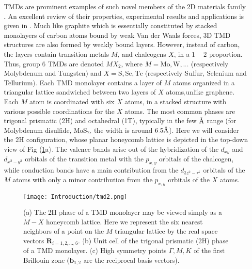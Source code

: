 \acl{TMD}s are prominent examples of such novel members of the \ac{2D} materials family \cite{wang_electronics_2012, roldan_electronic_2014, xu_spin_2014}.
An excellent review of their properties, experimental results and applications is given in \cite{manzeli_2d_2017}.
Much like graphite which is essentially constituted by stacked monolayers of carbon atoms bound by weak Van der Waals forces, 3D \ac{TMD} structures are also formed by weakly bound layers.
However, instead of carbon, the layers contain transition metals $M$, and chalcogens $X$, in a $1-2$ proportion.
Thus, group 6 \acp{TMD} are denoted $MX_2$, where $M = \text{Mo}, \text{W}, ...$ (respectively Molybdenum and Tungsten) and $X = \text{S}, \text{Se}, \text{Te}$ (respectively Sulfur, Selenium and Tellurium).
Each \acs{TMD} monolayer contains a layer of $M$ atoms organized in a triangular lattice sandwiched between two layers of $X$ atoms,unlike graphene.
Each $M$ atom is coordinated with six $X$ atoms, in a stacked structure with various possible coordinations for the $X$ atoms.
The most common phases are trigonal prismatic (2H) and octahedral (1T), typically in the few $\textup{\AA}$ range (for Molybdenum disulfide, $\text{Mo}\text{S}_2$, the width is around $6.5 \textup{\AA}$).
Here we will consider the 2H configuration, whose planar honeycomb lattice is depicted in the top-down view of Fig (\ref{fig:tmdHex}a).
The valence bands arise out of the hybridization of the $d_{xy}$ and $d_{x^2 - y^2}$ orbitals of the transition metal with the $p_{x, y}$ orbitals of the chalcogen, while conduction bands have a main contribution from the $d_{3z^2 - r^2}$ orbitals of the $M$ atoms with only a minor contribution from the $p_{x, y}$ orbitals of the $X$ atoms.
\begin{figure}[H]
\centering
\texttt{[image: Introduction/tmd2.png]}
 \caption[\ac{TMD} monolayer condensing in its 2H phase.
 $M-X$ honeycomb lattice.
 Unit cell of the trigonal prismatic (2H) phase of a \ac{TMD} monolayer.
 High symmetry points of the corresponding hexagonal lattice's  reciprocal space.]{(a) The 2H phase of a  \ac{TMD} monolayer may be viewed simply as a $M-X$ honeycomb lattice. Here we represent the six nearest neighbors of a point on the $M$ triangular lattice by the real space vectors $\bm R_{i = 1,2,..., 6}$.
(b) Unit cell of the trigonal prismatic (2H) phase of a \ac{TMD} monolayer.
(c) High symmetry points $\Gamma, M, K$ of the first Brillouin zone ($\bm b_{1,2}$ are the reciprocal basis vectors).\label{fig:tmdHex}}
\end{figure}

